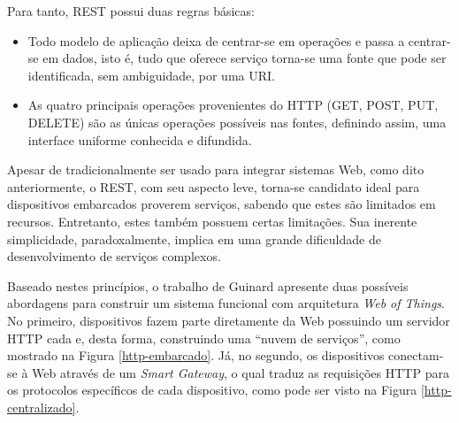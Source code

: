 \documentclass[12pt,a4paper,oneside]{report}
\begin{document}
Para tanto, REST possui duas regras básicas: 
\begin{itemize}
  \item Todo modelo de aplicação deixa de centrar-se em operações e passa a centrar-se em dados, isto é, tudo que oferece serviço torna-se uma fonte que pode ser identificada, sem ambiguidade, por uma URI. 
  \item As quatro principais operações provenientes do HTTP (GET, POST, PUT, DELETE) são as únicas operações possíveis nas fontes, definindo assim, uma interface uniforme conhecida e difundida. 
\end{itemize}

Apesar de tradicionalmente ser usado para integrar sistemas Web, como dito anteriormente, o REST, com seu aspecto leve, torna-se candidato ideal para dispositivos embarcados proverem serviços, sabendo que estes são limitados em recursos. Entretanto, estes também possuem certas limitações. Sua inerente simplicidade, paradoxalmente, implica em uma grande dificuldade de desenvolvimento de serviços complexos.

Baseado nestes princípios, o trabalho de Guinard \cite{wotdovad} apresente duas possíveis abordagens para construir um sistema funcional com arquitetura \emph{Web of Things}. No primeiro, dispositivos fazem parte diretamente da Web possuindo um servidor HTTP cada e, desta forma, construindo uma ``nuvem de serviços'', como mostrado na Figura \ref{http-embarcado}. Já, no segundo, os dispositivos conectam-se à Web através de um \emph{Smart Gateway}, o qual traduz as requisições HTTP para os protocolos específicos de cada dispositivo, como pode ser visto na Figura \ref{http-centralizado}.
\end{document}
